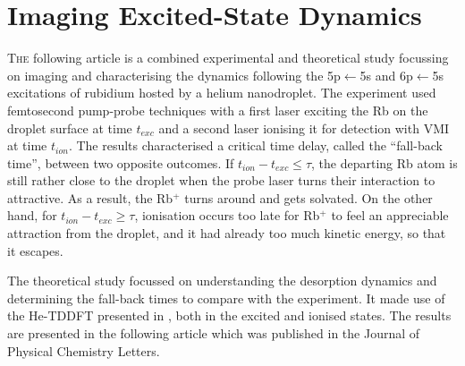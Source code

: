 \chapter{Imaging Excited-State Dynamics}\label{ch:exc-state-dyn}
	\lettrine[lines=4]{\color{activeColor}T}{he} following article is a combined experimental and theoretical study focussing on imaging and characterising the dynamics following the 5p$\leftarrow$5s and 6p$\leftarrow$5s excitations of rubidium hosted by a helium nanodroplet. The experiment used femtosecond pump-probe techniques with a first laser exciting the Rb on the droplet surface at time $t_{exc}$ and a second laser ionising it for detection with VMI at time $t_{ion}$. The results characterised a critical time delay, called the ``fall-back time'', between two opposite outcomes. If $t_{ion}-t_{exc}\leq\tau$, the departing Rb atom is still rather close to the droplet when the probe laser turns their interaction to attractive. As a result, the Rb$^+$ turns around and gets solvated. On the other hand, for $t_{ion}-t_{exc}\geq\tau$, ionisation occurs too late for Rb$^+$ to feel an appreciable attraction from the droplet, and it had already too much kinetic energy, so that it escapes. 
	
	The theoretical study focussed on understanding the desorption dynamics and determining the fall-back times to compare with the experiment. It made use of the He-TDDFT presented in , both in the excited and ionised states. The results are presented in the following article which was published in the Journal of Physical Chemistry Letters\citep{Vangerow2017}.
	
%	
	
\clearpage{\pagestyle{empty}\cleardoublepage}